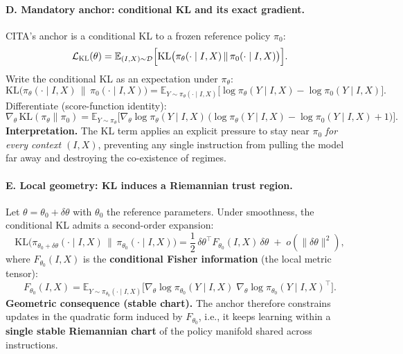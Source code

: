 \paragraph{\textbf{D. Mandatory anchor: conditional KL and its exact gradient.}}
CITA’s anchor is a conditional KL to a frozen reference policy $\pi_0$:
\[
\mathcal{L}_{\textsc{KL}}(\theta)
=
\mathbb{E}_{(I,X)\sim\mathcal{D}}
\Big[
\mathrm{KL}\big(\pi_\theta(\cdot\mid I,X)\,\|\,\pi_0(\cdot\mid I,X)\big)
\Big].
\]
Write the conditional KL as an expectation under $\pi_\theta$:
\[
\mathrm{KL}\big(\pi_\theta(\cdot\mid I,X)\,\|\,\pi_0(\cdot\mid I,X)\big)
=
\mathbb{E}_{Y\sim\pi_\theta(\cdot\mid I,X)}
\Big[
\log\pi_\theta(Y\mid I,X)-\log\pi_0(Y\mid I,X)
\Big].
\]
Differentiate (score-function identity):
\[
\nabla_\theta\,\mathrm{KL}(\pi_\theta\|\pi_0)
=
\mathbb{E}_{Y\sim\pi_\theta}
\Big[
\nabla_\theta\log\pi_\theta(Y\mid I,X)\,
\big(\log\pi_\theta(Y\mid I,X)-\log\pi_0(Y\mid I,X)+1\big)
\Big].
\]
\textbf{Interpretation.} The KL term applies an explicit pressure to stay near $\pi_0$ \emph{for every context $(I,X)$}, preventing any single instruction from pulling the model far away and destroying the co-existence of regimes.

\vspace{-0.35em}
\paragraph{\textbf{E. Local geometry: KL induces a Riemannian trust region.}}
Let $\theta=\theta_0+\delta\theta$ with $\theta_0$ the reference parameters.
Under smoothness, the conditional KL admits a second-order expansion:
\[
\mathrm{KL}\big(\pi_{\theta_0+\delta\theta}(\cdot\mid I,X)\,\|\,\pi_{\theta_0}(\cdot\mid I,X)\big)
=
\frac{1}{2}\,\delta\theta^\top F_{\theta_0}(I,X)\,\delta\theta
\;+\; o(\|\delta\theta\|^2),
\]
where $F_{\theta_0}(I,X)$ is the \textbf{conditional Fisher information} (the local metric tensor):
\[
F_{\theta_0}(I,X)
=
\mathbb{E}_{Y\sim\pi_{\theta_0}(\cdot\mid I,X)}
\Big[
\nabla_\theta\log\pi_{\theta_0}(Y\mid I,X)\;
\nabla_\theta\log\pi_{\theta_0}(Y\mid I,X)^\top
\Big].
\]
\textbf{Geometric consequence (stable chart).} The anchor therefore constrains updates in the quadratic form induced by $F_{\theta_0}$, i.e., it keeps learning within a \textbf{single stable Riemannian chart} of the policy manifold shared across instructions.

\vspace{-0.35em}
